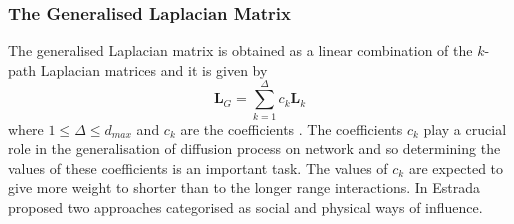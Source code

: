 \documentclass[10pt,a4paper]{article}
\theoremstyle{plain}
\theoremstyle{definition}
\begin{document}
%    	    	
    	    \subsubsection{The Generalised Laplacian Matrix}
    	    The generalised Laplacian matrix is obtained as a linear combination of the $k$-path Laplacian matrices and it is given by
    	    \begin{equation}
    	    \mathbf{L}_{G} = \sum_{k=1}^{\Delta} c_{k} \mathbf{L}_{k}
    	    \end{equation}
			where $1 \leq \Delta \leq d_{max}$ and $c_k$ are the coefficients \citep{estrada2012path}.
		    The coefficients $c_k$ play a crucial role in the generalisation of diffusion process on network and so determining the values of these coefficients is an important task. The values of $c_k$ are expected to give more weight to shorter than to the longer range interactions. In \citep{estrada2012path} Estrada proposed two approaches categorised as social and physical ways of influence.
		    
\end{document}
